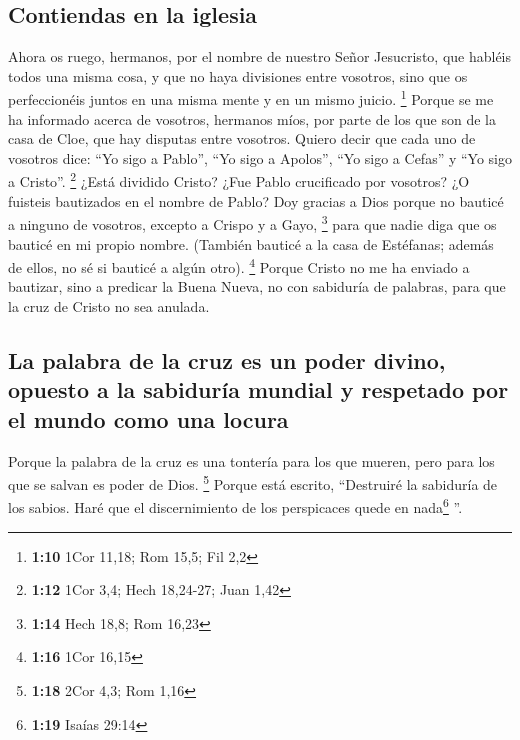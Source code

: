 \begin{paracol}{2}
\hypertarget{contiendas-en-la-iglesia}{%
\subsection{Contiendas en la iglesia}\label{contiendas-en-la-iglesia}}

 Ahora os ruego, hermanos, por el nombre de nuestro Señor
Jesucristo, que habléis todos una misma cosa, y que no haya divisiones
entre vosotros, sino que os perfeccionéis juntos en una misma mente y en
un mismo juicio. \footnote{\textbf{1:10} 1Cor 11,18; Rom 15,5; Fil 2,2}
 Porque se me ha informado acerca de vosotros, hermanos
míos, por parte de los que son de la casa de Cloe, que hay disputas
entre vosotros.  Quiero decir que cada uno de vosotros
dice: ``Yo sigo a Pablo'', ``Yo sigo a Apolos'', ``Yo sigo a Cefas'' y
``Yo sigo a Cristo''. \footnote{\textbf{1:12} 1Cor 3,4; Hech 18,24-27;
  Juan 1,42}  ¿Está dividido Cristo? ¿Fue Pablo
crucificado por vosotros? ¿O fuisteis bautizados en el nombre de Pablo?
 Doy gracias a Dios porque no bauticé a ninguno de
vosotros, excepto a Crispo y a Gayo, \footnote{\textbf{1:14} Hech 18,8;
  Rom 16,23}  para que nadie diga que os bauticé en mi
propio nombre.  (También bauticé a la casa de Estéfanas;
además de ellos, no sé si bauticé a algún otro). \footnote{\textbf{1:16}
  1Cor 16,15}  Porque Cristo no me ha enviado a bautizar,
sino a predicar la Buena Nueva, no con sabiduría de palabras, para que
la cruz de Cristo no sea anulada.

\hypertarget{la-palabra-de-la-cruz-es-un-poder-divino-opuesto-a-la-sabiduruxeda-mundial-y-respetado-por-el-mundo-como-una-locura}{%
\subsection{La palabra de la cruz es un poder divino, opuesto a la
sabiduría mundial y respetado por el mundo como una
locura}\label{la-palabra-de-la-cruz-es-un-poder-divino-opuesto-a-la-sabiduruxeda-mundial-y-respetado-por-el-mundo-como-una-locura}}

 Porque la palabra de la cruz es una tontería para los
que mueren, pero para los que se salvan es poder de Dios. \footnote{\textbf{1:18}
  2Cor 4,3; Rom 1,16}  Porque está escrito, ``Destruiré
la sabiduría de los sabios. Haré que el discernimiento de los
perspicaces quede en nada\footnote{\textbf{1:19} Isaías 29:14} ''.


\end{paracol}

